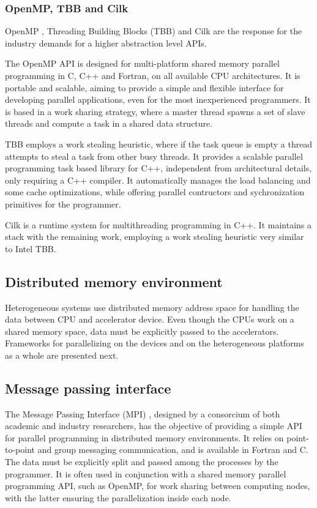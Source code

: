 \subsubsection*{OpenMP, TBB and Cilk}
\label{OpenMP}

OpenMP \cite{OpenMP}, \intel Threading Building Blocks (TBB) \cite{Intel:TBB} and Cilk \cite{Cilk} are the response for the industry demands for a higher abstraction level APIs.

The OpenMP API is designed for multi-platform shared memory parallel programming in C, C++ and Fortran, on all available CPU architectures. It is portable and scalable, aiming to provide a simple and flexible interface for developing parallel applications, even for the most inexperienced programmers. It is based in a work sharing strategy, where a master thread spawns a set of slave threads and compute a task in a shared data structure.

\intel TBB employs a work stealing heuristic, where if the task queue is empty a thread attempts to steal a task from other busy threads. It provides a scalable parallel programming task based library for C++, independent from architectural details, only requiring a C++ compiler. It automatically manages the load balancing and some cache optimizations, while offering parallel contructors and sychronization primitives for the programmer.

Cilk is a runtime system for multithreading programming in C++. It maintains a stack with the remaining work, employing a work stealing heuristic very similar to Intel TBB.

\subsection{Distributed memory environment}
\label{HeterogeneousFrameworks}

Heterogeneous systems use distributed memory address space for handling the data between CPU and accelerator device. Even though the CPUs work on a shared memory space, data must be explicitly passed to the accelerators. Frameworks for parallelizing on the devices and on the heterogeneous platforms as a whole are presented next.

\subsection*{Message passing interface}
\label{MPI}

The Message Passing Interface (MPI) \cite{MPI}, designed by a consorcium of both academic and industry researchers, has the objective of providing a simple API for parallel programming in distributed memory environments. It relies on point-to-point and group messaging communication, and is available in Fortran and C. The data must be explicitly split and passed among the processes by the programmer. It is often used in conjunction with a shared memory parallel programming API, such as OpenMP, for work sharing between computing nodes, with the latter ensuring the parallelization inside each node.

